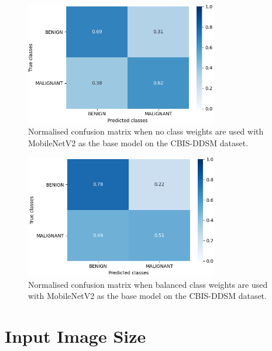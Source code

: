 \begin{figure}[h]
\centerline{\includegraphics[width=0.75\textwidth]{figures/evaluation/class_weights_experiment/none.png}}
\caption{\label{fig:evaluation-class_weights_experiment-none}Normalised confusion matrix when no class weights are used with MobileNetV2 as the base model on the CBIS-DDSM dataset.}
\end{figure}

\begin{figure}[H]
\centerline{\includegraphics[width=0.75\textwidth]{figures/evaluation/class_weights_experiment/balanced.png}}
\caption{\label{fig:evaluation-class_weights_experiment-balanced}Normalised confusion matrix when balanced class weights are used with MobileNetV2 as the base model on the CBIS-DDSM dataset.}
\end{figure}


\section{Input Image Size}
\label{sec:evaluation-input-image-size}

